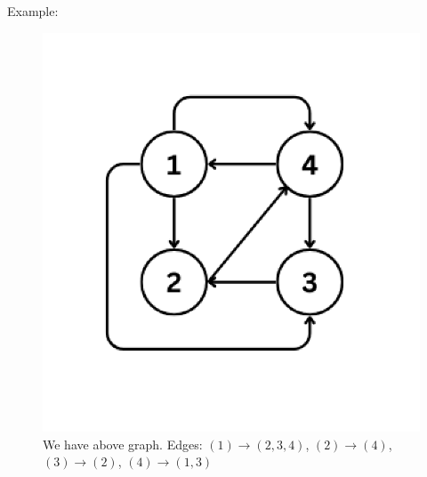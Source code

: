 \documentclass{article}
\begin{document}
\begin{enumerate}
\begin{lstlisting}
    \end{lstlisting}

    Example:

    \begin{figure}[H]
        \centering
        \begin{minipage}{0.3\textwidth}
            \centering
            \includegraphics[width=\textwidth]{image1.png}
            \caption{We have above graph. Edges:
                    $(1)\rightarrow(2,3,4)$,
                    $(2)\rightarrow(4)$,
                    $(3)\rightarrow(2)$,
                    $(4)\rightarrow(1,3)$}
        \end{minipage}
        \hspace{0.5cm}
        \begin{minipage}{0.3\textwidth}
            \centering

\end{minipage}
\end{figure}
\end{enumerate}
\end{document}
